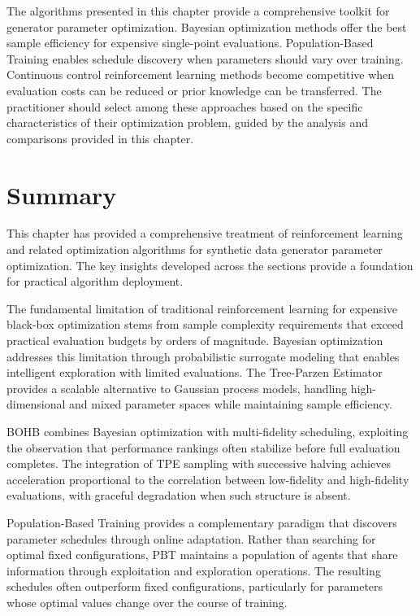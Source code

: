 The algorithms presented in this chapter provide a comprehensive toolkit for generator parameter optimization. Bayesian optimization methods offer the best sample efficiency for expensive single-point evaluations. Population-Based Training enables schedule discovery when parameters should vary over training. Continuous control reinforcement learning methods become competitive when evaluation costs can be reduced or prior knowledge can be transferred. The practitioner should select among these approaches based on the specific characteristics of their optimization problem, guided by the analysis and comparisons provided in this chapter.


\section{Summary}
\label{sec:chapter_summary}

This chapter has provided a comprehensive treatment of reinforcement learning and related optimization algorithms for synthetic data generator parameter optimization. The key insights developed across the sections provide a foundation for practical algorithm deployment.

The fundamental limitation of traditional reinforcement learning for expensive black-box optimization stems from sample complexity requirements that exceed practical evaluation budgets by orders of magnitude. Bayesian optimization addresses this limitation through probabilistic surrogate modeling that enables intelligent exploration with limited evaluations. The Tree-Parzen Estimator provides a scalable alternative to Gaussian process models, handling high-dimensional and mixed parameter spaces while maintaining sample efficiency.

BOHB combines Bayesian optimization with multi-fidelity scheduling, exploiting the observation that performance rankings often stabilize before full evaluation completes. The integration of TPE sampling with successive halving achieves acceleration proportional to the correlation between low-fidelity and high-fidelity evaluations, with graceful degradation when such structure is absent.

Population-Based Training provides a complementary paradigm that discovers parameter schedules through online adaptation. Rather than searching for optimal fixed configurations, PBT maintains a population of agents that share information through exploitation and exploration operations. The resulting schedules often outperform fixed configurations, particularly for parameters whose optimal values change over the course of training.

